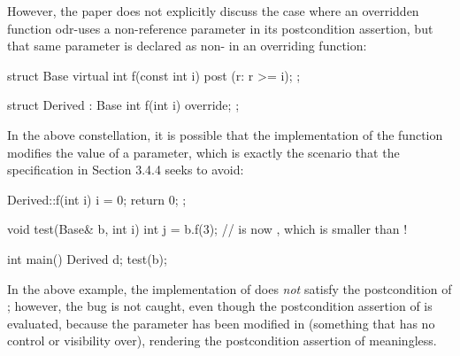 However, the paper does not explicitly discuss the case where an overridden function odr-uses a  non-reference parameter in its postcondition assertion, but that same parameter is declared as non- in an overriding function:
\begin{codeblock}
struct Base {
  virtual int f(const int i) post (r: r >= i);
};

struct Derived : Base {
  int f(int i) override;
};
\end{codeblock}
In the above constellation, it is possible that the implementation of the function modifies the value of a  parameter, which is exactly the scenario that the specification in \cite{P2900R10} Section 3.4.4 seeks to avoid:
\begin{codeblock}
Derived::f(int i) {
  i = 0;
  return 0;
};

void test(Base& b, int i) {
  int j = b.f(3);
  //  is now , which is smaller than !
}

int main() {
  Derived d;
  test(b);
}
\end{codeblock}
In the above example, the implementation of  does \emph{not} satisfy the postcondition of ; however, the bug is not caught, even though the postcondition assertion of  is evaluated, because the parameter  has been modified in  (something that  has no control or visibility over), rendering the postcondition assertion of  meaningless.

